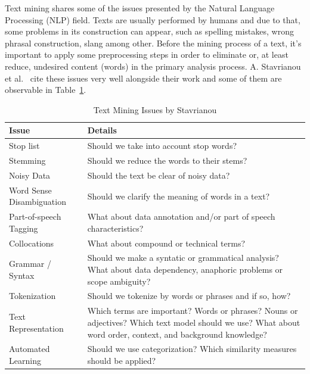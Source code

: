 Text mining shares some of the issues presented by the Natural Language Processing (NLP) field. Texts are usually performed by humans and due to that, some problems in its construction can appear, such as spelling mistakes, wrong phrasal construction, slang among other. Before the mining process of a text, it's important to apply some preprocessing steps in order to eliminate or, at least reduce, undesired content (words) in the primary analysis process.
A. Stavrianou et al.~\cite{kn:Stavrianou2007} cite these issues very well alongside their work and some of them are observable in Table~\ref{table:textminingissues}.

\begin{table}[htbp]
	\centering
	\caption{Text Mining Issues by Stavrianou \cite{kn:Stavrianou2007}}
	\label{table:textminingissues}
	\begin{tabular}{ | l | p{7cm} |}
		\hline \textbf{Issue}            & \textbf{Details}\\
		\hline Stop list                 & Should we take into account stop words?\\ 
		\hline Stemming                  & Should we reduce the words to their stems?\\ 
		\hline Noisy Data                & Should the text be clear of noisy data?\\ 
		\hline Word Sense Disambiguation & Should we clarify the meaning of words in a text?\\ 
		\hline Part-of-speech Tagging    & What about data annotation and/or part of speech characteristics?\\ 
		\hline Collocations              & What about compound or technical terms?\\ 
		\hline Grammar / Syntax          & Should we make a syntatic or grammatical analysis? What about data dependency, anaphoric problems or scope ambiguity?\\ 
		\hline Tokenization              & Should we tokenize by words or phrases and if so, how?\\ 
		\hline Text Representation       & Which terms are important? Words or phrases? Nouns or adjectives? Which text model should we use? What about word order, context, and background knowledge? \\ 
		\hline Automated Learning        & Should we use categorization? Which similarity measures should be applied? \\ \hline
	\end{tabular}
\end{table}

